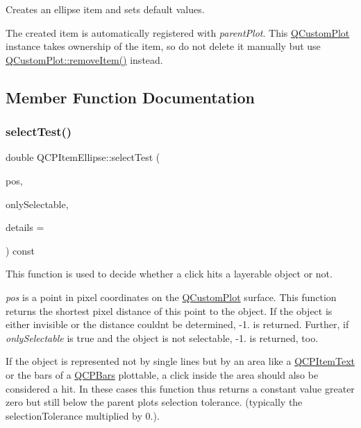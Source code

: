 Creates an ellipse item and sets default values.

The created item is automatically registered with {\itshape parent\+Plot}. This \hyperlink{class_q_custom_plot}{Q\+Custom\+Plot} instance takes ownership of the item, so do not delete it manually but use \hyperlink{class_q_custom_plot_ae04446557292551e8fb6e2c106e1848d}{Q\+Custom\+Plot\+::remove\+Item()} instead. 

\subsection{Member Function Documentation}
\mbox{\label{class_q_c_p_item_ellipse_ab6e2b8a29695c606c7731e498297ca29}} 
\subsubsection{\texorpdfstring{select\+Test()}{selectTest()}}
{\footnotesize\ttfamily double Q\+C\+P\+Item\+Ellipse\+::select\+Test (\begin{DoxyParamCaption}\item[{const Q\+PointF \&}]{pos,  }\item[{bool}]{only\+Selectable,  }\item[{Q\+Variant $\ast$}]{details = {} }\end{DoxyParamCaption}) const\hspace{0.3cm}{\ttfamily [virtual]}}

This function is used to decide whether a click hits a layerable object or not.

{\itshape pos} is a point in pixel coordinates on the \hyperlink{class_q_custom_plot}{Q\+Custom\+Plot} surface. This function returns the shortest pixel distance of this point to the object. If the object is either invisible or the distance couldn\textquotesingle{}t be determined, -\/1. is returned. Further, if {\itshape only\+Selectable} is true and the object is not selectable, -\/1. is returned, too.

If the object is represented not by single lines but by an area like a \hyperlink{class_q_c_p_item_text}{Q\+C\+P\+Item\+Text} or the bars of a \hyperlink{class_q_c_p_bars}{Q\+C\+P\+Bars} plottable, a click inside the area should also be considered a hit. In these cases this function thus returns a constant value greater zero but still below the parent plot\textquotesingle{}s selection tolerance. (typically the selection\+Tolerance multiplied by 0.).

